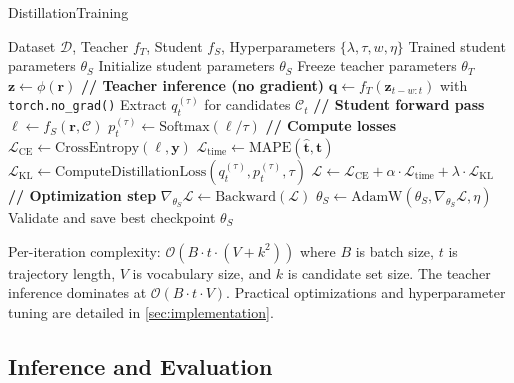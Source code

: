 \begin{algorithm}[t]
\caption{DistillationTraining}
\label{alg:distill-train}
\begin{algorithmic}
\Require Dataset $\mathcal{D}$, Teacher $f_T$, Student $f_S$, Hyperparameters $\{\lambda, \tau, w, \eta\}$
\Ensure Trained student parameters $\theta_S$
\State Initialize student parameters $\theta_S$
\State Freeze teacher parameters $\theta_T$ 
     
        \State $\mathbf{z} \gets \phi(\mathbf{r})$ 
        \State \textbf{// Teacher inference (no gradient)}
        \State $\mathbf{q} \gets f_T(\mathbf{z}_{t-w:t})$ with \texttt{torch.no\_grad()}
        \State Extract $q_t^{(\tau)}$ for candidates $\mathcal{C}_t$ 
        \State \textbf{// Student forward pass}
        \State $\mathbf{\ell} \gets f_S(\mathbf{r}, \mathcal{C})$ 
        \State $p_t^{(\tau)} \gets \text{Softmax}(\mathbf{\ell} / \tau)$
        \State \textbf{// Compute losses}
        \State $\mathcal{L}_{\text{CE}} \gets \text{CrossEntropy}(\mathbf{\ell}, \mathbf{y})$
        \State $\mathcal{L}_{\text{time}} \gets \text{MAPE}(\hat{\mathbf{t}}, \mathbf{t})$
        \State $\mathcal{L}_{\text{KL}} \gets \text{ComputeDistillationLoss}(q_t^{(\tau)}, p_t^{(\tau)}, \tau)$
        \State $\mathcal{L} \gets \mathcal{L}_{\text{CE}} + \alpha \cdot \mathcal{L}_{\text{time}} + \lambda \cdot \mathcal{L}_{\text{KL}}$
        \State \textbf{// Optimization step}
        \State $\nabla_{\theta_S} \mathcal{L} \gets \text{Backward}(\mathcal{L})$
        \State $\theta_S \gets \text{AdamW}(\theta_S, \nabla_{\theta_S} \mathcal{L}, \eta)$
    \EndFor
    \State Validate and save best checkpoint
\EndFor
\State \Return $\theta_S$
\end{algorithmic}
\end{algorithm}

\begin{remark}
Per-iteration complexity: $\mathcal{O}(B \cdot t \cdot (V + k^2))$ where $B$ is batch size, $t$ is trajectory length, $V$ is vocabulary size, and $k$ is candidate set size. The teacher inference dominates at $\mathcal{O}(B \cdot t \cdot V)$. Practical optimizations and hyperparameter tuning are detailed in \autoref{sec:implementation}.
\end{remark}

\subsection{Inference and Evaluation}
\label{sec:method-inference}

